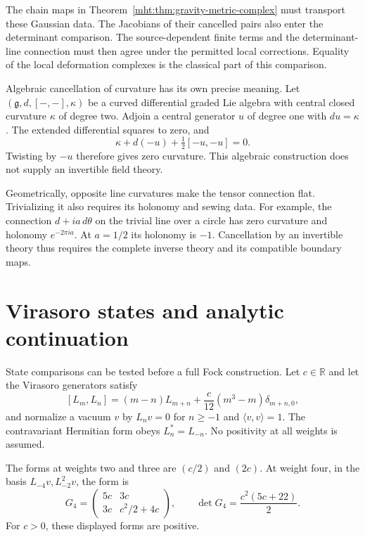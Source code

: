 The chain maps in Theorem~\ref{mht:thm:gravity-metric-complex}
must transport these Gaussian data.
The Jacobians of their cancelled pairs also enter the determinant
comparison.
The source-dependent finite terms and the determinant-line
connection must then agree under the permitted local corrections.
Equality of the local deformation complexes is the classical
part of this comparison.

Algebraic cancellation of curvature has its own precise meaning.
Let $(\mathfrak g,d,[-,-],\kappa)$ be a curved differential graded
Lie algebra with central closed curvature $\kappa$ of degree two.
Adjoin a central generator $u$ of degree one with $du=\kappa$.
The extended differential squares to zero, and
\[
 \kappa+d(-u)+\tfrac12[-u,-u]=0.
\]
Twisting by $-u$ therefore gives zero curvature.
This algebraic construction does not supply an invertible field theory.

Geometrically, opposite line curvatures make the tensor connection
flat. Trivializing it also requires its holonomy and sewing data.
For example, the connection $d+ia\,d\theta$ on the trivial line
over a circle has zero curvature and holonomy $e^{-2\pi ia}$.
At $a=1/2$ its holonomy is $-1$.
Cancellation by an invertible theory thus requires the complete
inverse theory and its compatible boundary maps.

\section{Virasoro states and analytic continuation}

State comparisons can be tested before a full Fock construction.
Let $c\in\mathbb R$ and let the Virasoro generators satisfy
\[
 [L_m,L_n]=(m-n)L_{m+n}
       +\frac{c}{12}(m^3-m)\delta_{m+n,0},
\]
and normalize a vacuum $v$ by
$L_nv=0$ for $n\ge-1$ and $\langle v,v\rangle=1$.
The contravariant Hermitian form obeys $L_n^*=L_{-n}$.
No positivity at all weights is assumed.

\begin{proposition}\label{mht:prop:gravity-vacuum-gram}
The forms at weights two and three are $(c/2)$ and $(2c)$.
At weight four, in the basis $L_{-4}v,L_{-2}^2v$, the form is
\begin{equation}\label{mht:eq:gravity-gram-four}
 G_4=\begin{pmatrix}5c&3c\\3c&c^2/2+4c\end{pmatrix},
 \qquad \det G_4=\frac{c^2(5c+22)}2.
\end{equation}
For $c>0$, these displayed forms are positive.
\end{proposition}

